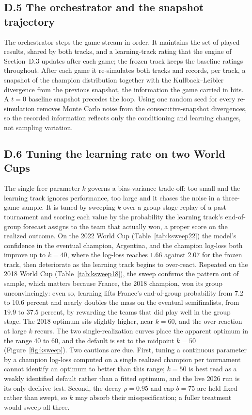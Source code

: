 \documentclass[11pt,letterpaper]{article}
\begin{document}
\subsection*{D.5 \quad The orchestrator and the snapshot trajectory}

The orchestrator steps the game stream in order. It maintains the set of played results, shared by both tracks, and a learning-track rating that the engine of Section~D.3 updates after each game; the frozen track keeps the baseline ratings throughout. After each game it re-simulates both tracks and records, per track, a snapshot of the champion distribution together with the Kullback--Leibler divergence from the previous snapshot, the information the game carried in bits. A $t=0$ baseline snapshot precedes the loop. Using one random seed for every re-simulation removes Monte Carlo noise from the consecutive-snapshot divergences, so the recorded information reflects only the conditioning and learning changes, not sampling variation.

\subsection*{D.6 \quad Tuning the learning rate on two World Cups}

The single free parameter $k$ governs a bias-variance trade-off: too small and the learning track ignores performance, too large and it chases the noise in a three-game sample. It is tuned by sweeping $k$ over a group-stage replay of a past tournament and scoring each value by the probability the learning track's end-of-group forecast assigns to the team that actually won, a proper score on the realized outcome. On the 2022 World Cup (Table~\ref{tab:ksweep22}) the model's confidence in the eventual champion, Argentina, and the champion log-loss both improve up to $k=40$, where the log-loss reaches $1.66$ against $2.07$ for the frozen track, then deteriorate as the learning track begins to over-react. Repeated on the 2018 World Cup (Table~\ref{tab:ksweep18}), the sweep confirms the pattern out of sample, which matters because France, the 2018 champion, won its group unconvincingly: even so, learning lifts France's end-of-group probability from $7.2$ to $10.6$ percent and nearly doubles the mass on the eventual semifinalists, from $19.9$ to $37.5$ percent, by rewarding the teams that did play well in the group stage. The 2018 optimum sits slightly higher, near $k=60$, and the over-reaction at large $k$ recurs. The two single-realization curves place the apparent optimum in the range $40$ to $60$, and the default is set to the midpoint $k=50$ (Figure~\ref{fig:ksweep}). Two cautions are due. First, tuning a continuous parameter by a champion log-loss computed on a single realized champion per tournament cannot identify an optimum to better than this range; $k=50$ is best read as a weakly identified default rather than a fitted optimum, and the live 2026 run is its only decisive test. Second, the decay $\rho=0.95$ and cap $b=75$ are held fixed rather than swept, so $k$ may absorb their misspecification; a fuller treatment would sweep all three.
\end{document}
